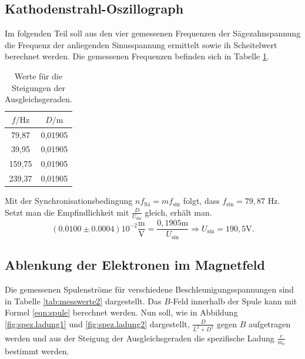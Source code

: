 \subsection{Kathodenstrahl-Oszillograph}
Im folgenden Teil soll aus den vier gemessenen Frequenzen der Sägezahnspannung die Frequenz der anliegenden Sinusspannung ermittelt sowie ih Scheitelwert berechnet werden. Die gemessenen Frequenzen befinden sich in Tabelle \ref{tab:frequenzen}.

\begin{table}
  \caption{Werte für die Steigungen der Ausgleichsgeraden.}
  \centering
  \label{tab:frequenzen}
  \begin{tabular}{c c}
    \toprule
    $f / \si{\Hz}$ & $D/\si{\meter}$ \\
    \midrule
79,87 & 0,01905 \\
39,95 & 0,01905\\
159,75 & 0,01905 \\
239,37 & 0,01905 \\
\bottomrule
\end{tabular}
\end{table}

Mit der Synchronisationsbedingung $n f_\mathrm{Sä}= m f_\mathrm{sin}$ folgt, dass $f_\mathrm{sin}=79,87$ \si{\Hz}.
Setzt man die Empfindlichkeit mit $\frac{D}{U_\mathrm{sin}}$ gleich, erhält man.
\begin{equation}
  (0.0100 \pm 0.0004)10^{-2}\frac{\si{\meter}}{\si{\volt}} = \frac{0,1905 \si{\meter}}{U_\mathrm{sin}}
\Rightarrow U_\mathrm{sin} = 190,5 \si{\volt}.
\end{equation}

\subsection{Ablenkung der Elektronen im Magnetfeld}
Die gemessenen Spulenströme für verschiedene Beschleunigungsspannungen sind in Tabelle \ref{tab:messwerte2} dargestellt. Das $B$-Feld innerhalb der Spule kann mit Formel \eqref{eqn:spule} berechnet werden. Nun soll, wie in Abbildung \ref{fig:spez.ladung1} und \ref{fig:spez.ladung2} dargestellt, $\frac{D}{L^2+D^2}$ gegen $B$ aufgetragen werden und aus der Steigung der Ausgleichsgeraden die spezifische Ladung $\frac{e}{m_\mathrm{e}}$ bestimmt werden.

